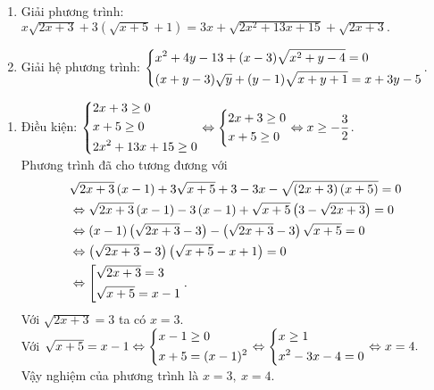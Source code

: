 \begin{ex}%
\hfill

    \begin{enumerate}    
        \item Giải phương trình: $x\sqrt{2x+3}+3(\sqrt{x+5}+1)=3x+\sqrt{2x^{2}+13x+15}+\sqrt{2x+3}.$
        \item Giải hệ phương trình: $\left\{\begin{aligned}&x^2+4y-13 +(x-3)\sqrt{x^2+y-4}=0 \\& (x+y-3)\sqrt{y}+(y-1)\sqrt{x+y+1}=x+3y-5 \end{aligned}\right.$.
    \end{enumerate}
\loigiai
    {
    \begin{enumerate}
        \item Điều kiện: $\left\{\begin{aligned} & 2x+3\ge 0 \\  & x+5\ge 0 \\  & 2x^2+13x+15\ge 0\end{aligned}\right. \Leftrightarrow \left\{\begin{aligned} & 2x+3\ge 0 \\  & x+5\ge 0 \end{aligned}\right. \Leftrightarrow x\ge -\dfrac{3}{2}$.\\
        Phương trình đã cho tương đương với 
        $$\begin{aligned} & \sqrt{2x+3}\left( x-1 \right)+3\sqrt{x+5}+3-3x-\sqrt{\left( 2x+3 \right)\left( x+5 \right)}=0 \\&\Leftrightarrow \sqrt{2x+3}\left( x-1 \right)-3\left( x-1 \right)+\sqrt{x+5}\left( 3-\sqrt{2x+3} \right)=0\\
  & \Leftrightarrow \left( x-1 \right)\left( \sqrt{2x+3}-3 \right)-\left( \sqrt{2x+3}-3 \right)\sqrt{x+5}=0 \\  & \Leftrightarrow \left( \sqrt{2x+3}-3 \right)\left( \sqrt{x+5}-x+1 \right)=0 \\ &
\Leftrightarrow \left[\begin{aligned}  & \sqrt{2x+3}=3 \\  & \sqrt{x+5}=x-1 \end{aligned}\right.. \end{aligned}$$
Với $\sqrt{2x+3}=3$ ta có $x=3$.\\
Với $\sqrt{x+5}=x-1 \Leftrightarrow \left\{\begin{aligned}&x-1 \geq 0 \\& x+5=(x-1)^2\end{aligned}\right. \Leftrightarrow \left\{\begin{aligned}&x\geq 1 \\& x^2-3x-4=0\end{aligned}\right. \Leftrightarrow x=4 .$\\
Vậy nghiệm của phương trình là $x=3,\ x=4.$
        

\end{enumerate}}
\end{ex}
